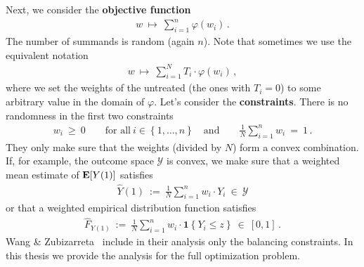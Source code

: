 Next, we consider the \textbf{objective function}
\begin{gather*}
  w
  \ 
  \mapsto
  \ 
    \sum_{i = 1}^{n} 
    \varphi(w_i)
    \,.
\end{gather*}
The number of summands is random (again $n$).
Note that sometimes we use the equivalent notation
\begin{gather*}
  w
  \ 
  \mapsto
  \ 
    \sum_{i = 1}^{N} 
    T_i
    \cdot
    \varphi(w_i)
    \,,
\end{gather*}
where we set the weights of the untreated (the ones with $T_i=0$) to some arbitrary value in the domain of $\varphi$.
Let's consider the \textbf{constraints}. There is no randomness in the first two constraints
\begin{gather*}
    w_i 
    \ 
    \ge
    \ 
    0
    \qquad
    \text{for all}\ 
    i \in \left\{ 1, \ldots, n \right\}
    \quad
    \text{and}
    \qquad
    \frac{1}{N}
    \sum_{i=1}^{n} 
    w_i
    \ 
    =
    \ 
    1
    \,.
\end{gather*}
They only make sure that the weights (divided by $N$) form a convex combination.
If, for example, the outcome space $\mathcal{Y}$ is convex, we make sure that a weighted mean estimate of $\mathbf{E}[Y(1)]$ satisfies
\begin{gather*}
  \widehat{Y}(1) 
  \ 
  :=
  \ 
  \frac{1}{N}
  \sum_{i=1}^{n} 
  w_i\cdot Y_i
  \ 
  \in
  \ 
  \mathcal{Y}
\end{gather*}
or that a weighted empirical distribution function satisfies
\begin{gather*}
  \widehat{F}_{Y(1)} 
  \ 
  :=
  \ 
  \frac{1}{N}
  \sum_{i=1}^{n} 
  w_i\cdot \mathbf{1}\left\{ Y_i\le z \right\}
  \ 
  \in
  \ 
  [0,1]
  \,.
\end{gather*}
Wang \& Zubizarreta~\cite{Wang2019} include in their analysis only the balancing constraints.
In this thesis we provide the analysis for the full optimization problem.

